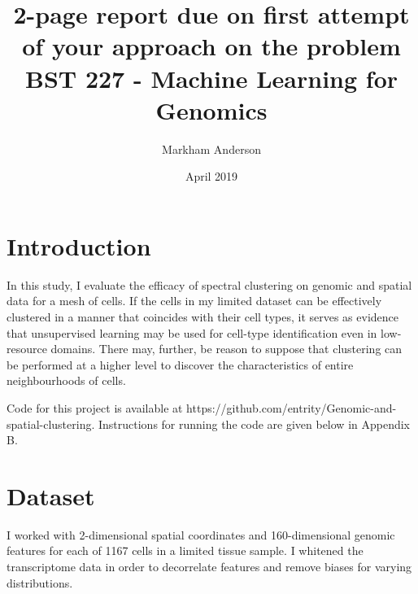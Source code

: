 \documentclass{article}
\title{2-page report due on first attempt of your approach on the problem \\
\large BST 227 - Machine Learning for Genomics}
\author{Markham Anderson}
\date{April 2019}
\newcommand{\nData}{1167}
\begin{document}
\maketitle
\small

\section{Introduction}

In this study, I evaluate the efficacy of spectral clustering on genomic and spatial data for a mesh of cells. If the cells in my limited dataset can be effectively clustered in a manner that coincides with their cell types, it serves as evidence that unsupervised learning may be used for cell-type identification even in low-resource domains. There may, further, be reason to suppose that clustering can be performed at a higher level to discover the characteristics of entire neighbourhoods of cells.




Code for this project is available at https://github.com/entrity/Genomic-and-spatial-clustering. Instructions for running the code are given below in Appendix B.

\section{Dataset}

I worked with 2-dimensional spatial coordinates and 160-dimensional genomic features for each of \nData{} cells in a limited tissue sample. I whitened the transcriptome data in order to decorrelate features and remove biases for varying distributions.
\end{document}
